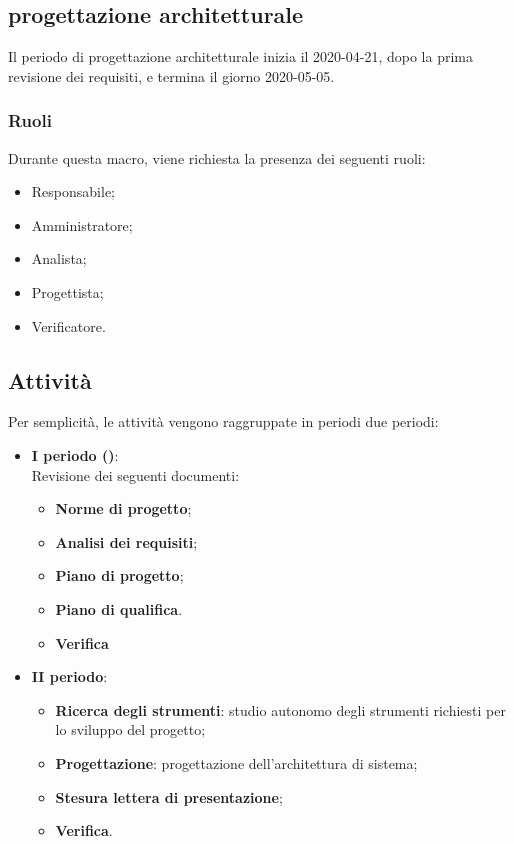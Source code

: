 \documentclass[../piano-di-progetto.tex]{subfiles}
\begin{document}
\subsection{progettazione architetturale}
Il periodo di progettazione architetturale inizia il 2020-04-21, dopo la prima revisione dei requisiti, e termina il giorno 2020-05-05. 

\subsubsection{Ruoli}
Durante questa macro, viene richiesta la presenza dei seguenti ruoli:
\begin{itemize}
    \item Responsabile;
    \item Amministratore;
    \item Analista;
    \item Progettista;
    \item Verificatore.
\end{itemize}

\subsection{Attività}   
Per semplicità, le attività vengono raggruppate in periodi due periodi:
\begin{itemize}

    \item \textbf{I periodo ()}: \\
        Revisione dei seguenti documenti:
        \begin{itemize}
            \item \textbf{Norme di progetto};
            \item \textbf{Analisi dei requisiti};
            \item \textbf{Piano di progetto};
            \item \textbf{Piano di qualifica}.
            \\
            \item \textbf{Verifica}
        \end{itemize}
    \item \textbf{II periodo}:
        \begin{itemize}
            \item \textbf{Ricerca degli strumenti}: studio autonomo degli strumenti richiesti per lo sviluppo del progetto; 
            \item \textbf{Progettazione}: progettazione dell'architettura di sistema;
            \item \textbf{Stesura lettera di presentazione};
            \item \textbf{Verifica}.

        \end{itemize}
        

\end{itemize}
\end{document}
